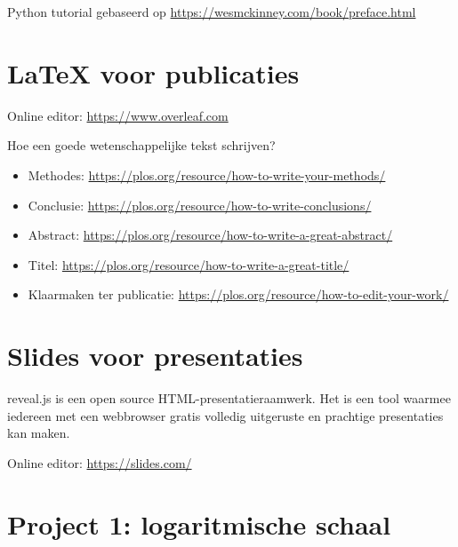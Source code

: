 \documentclass[
  letterpaper,
  DIV=11,
  numbers=noendperiod]{scrreprt}
\begin{document}
Python tutorial gebaseerd op
\url{https://wesmckinney.com/book/preface.html}


\hypertarget{latex-voor-publicaties}{%
\chapter{LaTeX voor publicaties}\label{latex-voor-publicaties}}

Online editor: \url{https://www.overleaf.com}

Hoe een goede wetenschappelijke tekst schrijven?

\begin{itemize}
\item
  Methodes: \url{https://plos.org/resource/how-to-write-your-methods/}
\item
  Conclusie: \url{https://plos.org/resource/how-to-write-conclusions/}
\item
  Abstract:
  \url{https://plos.org/resource/how-to-write-a-great-abstract/}
\item
  Titel: \url{https://plos.org/resource/how-to-write-a-great-title/}
\item
  Klaarmaken ter publicatie:
  \url{https://plos.org/resource/how-to-edit-your-work/}
\end{itemize}


\hypertarget{slides-voor-presentaties}{%
\chapter{Slides voor presentaties}\label{slides-voor-presentaties}}

reveal.js is een open source HTML-presentatieraamwerk. Het is een tool
waarmee iedereen met een webbrowser gratis volledig uitgeruste en
prachtige presentaties kan maken.

Online editor: \url{https://slides.com/}


\hypertarget{project-1-logaritmische-schaal}{%
\chapter*{Project 1: logaritmische
schaal}\label{project-1-logaritmische-schaal}}

\end{document}
